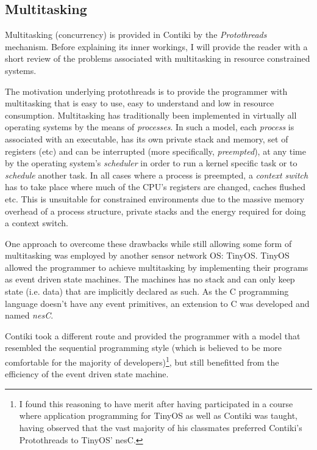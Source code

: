 \documentclass[final,a4paper,twoside,11pt,onecolumn]{report}
\begin{document}
\subsection{Multitasking}
Multitasking (concurrency) is provided in Contiki by the \emph{Protothreads} mechanism\cite{dunkels2005protothreads}. Before explaining its inner workings, I will provide the reader with a short review of the problems associated with multitasking in resource constrained systems.

The motivation underlying protothreads is to provide the programmer with multitasking that is easy to use, easy to understand and low in resource consumption. Multitasking has traditionally been implemented in virtually all operating systems by the means of \emph{processes}. In such a model, each \emph{process} is associated with an executable, has its own private stack and memory, set of registers (etc) and can be interrupted (more specifically, \emph{preempted}), at any time by the operating system's \emph{scheduler} in order to run a kernel specific task or to \emph{schedule} another task. In all cases where a process is preempted, a \emph{context switch} has to take place where much of the CPU's registers are changed, caches flushed etc. This is unsuitable for constrained environments due to the massive memory overhead of a process structure, private stacks and the energy required for doing a context switch.

One approach to overcome these drawbacks while still allowing some form of multitasking was employed by another sensor network OS: TinyOS\cite{levis2005tinyos}. TinyOS allowed the programmer to achieve multitasking by implementing their programs as event driven state machines. The machines has no stack and can only keep state (i.e. data) that are implicitly declared as such. As the C programming language doesn't have any event primitives, an extension to C was developed and named \emph{nesC}\cite{gay2003nesc}.

Contiki took a different route and provided the programmer with a model that resembled the sequential programming style (which is believed to be more comfortable for the majority of developers)\footnote{I found this reasoning to have merit after having participated in a course where application programming for TinyOS as well as Contiki was taught, having observed that the vast majority of his classmates preferred Contiki's Protothreads to TinyOS' nesC.}, but still benefitted from the efficiency of the event driven state machine.
\end{document}
